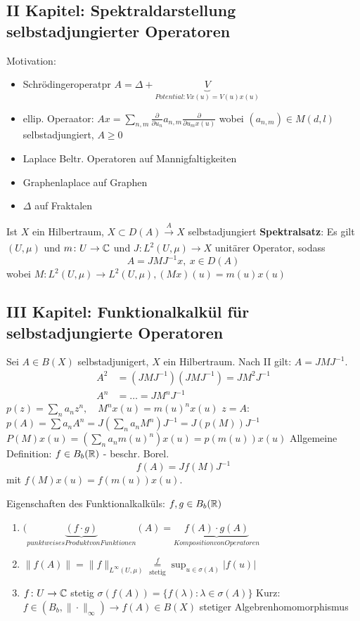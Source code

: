 \subsection*{II Kapitel: Spektraldarstellung selbstadjungierter Operatoren}

Motivation: 
\begin{itemize}
	\item Schrödingeroperatpr $A = \Delta + \underbrace{V}_{Potential : V x(u) = V(u) x(u)}$
	\item ellip. Operaator: $A x = \sum_{n, m} \frac{\partial}{\partial u_{n}} a_{n, m} \frac{\partial}{\partial u_{m} x(u)}$ wobei $(a_{n, m}) \in M(d, l)$ selbstadjungiert, $A \geq 0$
	\item Laplace Beltr. Operatoren auf Mannigfaltigkeiten
	\item Graphenlaplace auf Graphen
	\item $\Delta$ auf Fraktalen
\end{itemize}

Ist $X$ ein Hilbertraum, $X \subset D(A) \xrightarrow[]{A} X$ selbstadjungiert
\textbf{Spektralsatz}: Es gilt $(U, \mu)$ und $m \colon U \rightarrow \mathbb{C}$ und $J \colon L^{2}(U, \mu) \rightarrow X$ unitärer Operator, sodass
	\[ A = J M J^{-1} x, ~ x \in D(A) \]
	wobei $M \colon L^{2}(U, \mu) \rightarrow L^{2}(U, \mu), (M x)(u) = m(u)x(u)$


\subsection*{III Kapitel: Funktionalkalkül für selbstadjungierte Operatoren}

 Sei $A \in B(X)$ selbstadjunigert, $X$ ein Hilbertraum. Nach II gilt: $A = J M J^{-1}$.
 \begin{align*}
 	A^{2} & = (J M J^{-1})(J M J^{-1}) = J M^{2} J^{-1} \\
	A^{n} & = \dotsc  = J M^{n} J^{-1} 
 \end{align*}
 $p(z) = \sum_{n} a_{n} z^{n}, \quad M^{n} x(u) = m(u)^{n} x(u)$
 $z = A$: $p(A) = \sum a_{n} A^{n} = J (\sum_{n} a_{n} M^{n} ) J^{-1} = J ( p(M) ) J^{-1}$
 $P(M)x(u) = ( \sum_{n} a_{n} m(u)^{n} ) x(u) = p(m(u)) x(u)$
 Allgemeine Definition: $f \in B_{b}(\mathbb{R})$ - beschr. Borel.
 	\[ f(A) = J f(M) J^{-1} \]
 mit $f(M) x(u) = f(m(u)) x(u)$.
 
 Eigenschaften des Funktionalkalküls: $f, g \in B_{b}(\mathbb{R})$
 \begin{enumerate}[label=\roman*\upshape)]
 	\item $(\underbrace{(f \cdot g)}_{punktweises Produkt von Funktionen}(A) = \underbrace{f(A) \cdot g(A)}_{Komposition von Operatoren}$
 	\item $\| f(A) \| = \| f \|_{L^{\infty}(U, \mu)} \underset{\text{stetig}}{\overset{f}{=}} \sup_{u \in \sigma(A)} |f(u) |$
 	\item $f \colon U \rightarrow \mathbb{C}$ stetig
 		$\sigma( f(A) ) = \{ f(\lambda) : \lambda \in \sigma(A) \}$
 		Kurz: $f \in (B_{b}, \| \cdot \|_{\infty} ) \rightarrow f(A) \in B(X)$ stetiger Algebrenhomomorphismus
 \end{enumerate}
 
